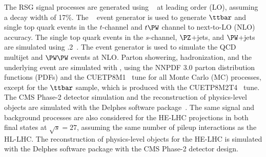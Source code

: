 The RSG signal processes are generated using ~\cite{PYTHIA82} at leading order (LO), assuming a decay width of 17\%.
The ~\cite{Nason:2004rx,Frixione:2007vw,Alioli:2010xd,Frixione:2007nw} event generator is used to generate $\ttbar$ and single top quark events in the $t$-channel and $t\PW$ channel to next-to-LO (NLO) accuracy.
The single top quark events in the $s$-channel, $\PZ$+jets, and $\PW$+jets are simulated using .2~\cite{Alwall:2014hca}. 
The \PYTHIA event generator is used to simulate the QCD multijet and $\PW\PW$ events at NLO. 
Parton showering, hadronization, and the underlying event are simulated with \PYTHIA, using the NNPDF 3.0 parton distribution functions (PDFs) and the CUETP8M1~\cite{CUETP8M1,Skands:2014pea} tune for all Monte Carlo (MC) processes, except for the $\ttbar$ sample, which is produced with the CUETP8M2T4~\cite{CMS-PAS-TOP-16-021} tune.
The CMS Phase-2 detector simulation and the reconstruction of physics-level objects are simulated with the Delphes software package~\cite{deFavereau2014}. The same signal and background processes are also considered for the HE-LHC projections in both final states at $\sqrt{s} = 27$\TeV, assuming the same number of pileup interactions as the HL-LHC.
The reconstruction of physics-level objects for the HE-LHC is simulated with the Delphes software package with the CMS Phase-2 detector design.

